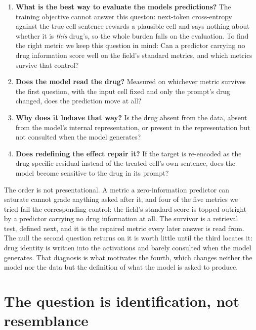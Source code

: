 \begin{enumerate}
  \item \textbf{What is the best way to evaluate the models predictions?} The training objective cannot answer
  this queston: next-token cross-entropy against the true cell sentence rewards a
  plausible cell and says nothing about whether it is \emph{this} drug's,
  so the whole burden falls on the evaluation. To find the right metric we keep this question in mind: Can a predictor carrying
  no drug information score well on the field's standard metrics, and
  which metrics survive that control?
  \item \textbf{Does the model read the drug?} Measured on whichever metric
        survives the first question, with the input cell fixed and only the
        prompt's drug changed, does the prediction move at all?
  \item \textbf{Why does it behave that way?} Is the drug absent from the data,
        absent from the model's internal representation, or present in the
        representation but not consulted when the model generates?
  \item \textbf{Does redefining the effect repair it?} If the target is
        re-encoded as the drug-specific residual instead of the treated cell's
        own sentence, does the model become sensitive to the drug in its prompt?
\end{enumerate}

\noindent
The order is not presentational. A metric a zero-information predictor can
saturate cannot grade anything asked after it, and four of the five metrics we
tried fail the corresponding control: the field's standard score is topped
outright by a predictor carrying no drug information at all. The survivor is a retrieval
test, defined next, and it is the repaired metric every later answer is read
from. The null the second question returns on it is worth little until the third
locates it: drug identity is written into the activations and barely consulted
when the model generates. That diagnosis is what motivates the fourth, which
changes neither the model nor the data but the definition of what the model is
asked to produce.

\section{The question is identification, not resemblance}
\label{sec:intro-question}

